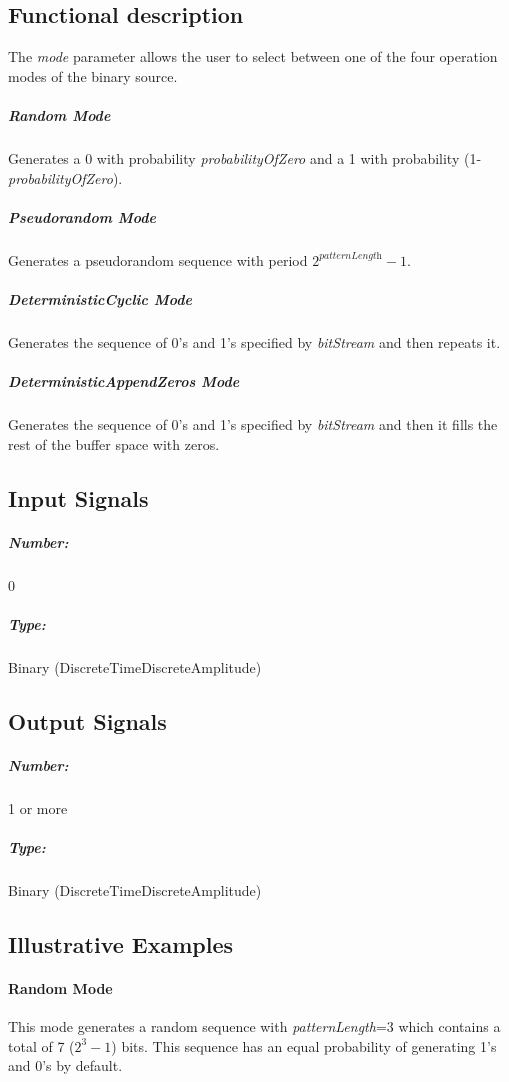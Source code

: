 \subsection*{Functional description}

The \textit{mode} parameter allows the user to select between one of the four operation modes of the binary source.

\subparagraph*{Random Mode}
Generates a 0 with probability \textit{probabilityOfZero} and a 1 with probability (1-\textit{probabilityOfZero}).

\subparagraph*{Pseudorandom Mode}
Generates a pseudorandom sequence with period $2^\textit{patternLength}-1$.

\subparagraph*{DeterministicCyclic Mode}
Generates the sequence of 0's and 1's specified by \textit{bitStream} and then repeats it.

\subparagraph*{DeterministicAppendZeros Mode}
Generates the sequence of 0's and 1's specified by \textit{bitStream} and then it fills the rest of the buffer space with zeros.



\subsection*{Input Signals}


\subparagraph*{Number:} 0

\subparagraph*{Type:} Binary (DiscreteTimeDiscreteAmplitude)

\subsection*{Output Signals}

\subparagraph*{Number:} 1 or more

\subparagraph*{Type:} Binary (DiscreteTimeDiscreteAmplitude)

\subsection*{Illustrative Examples}

\paragraph*{Random Mode}
This mode generates a random sequence with \textit{patternLength}=3 which contains a total of 7 ($2^3-1$) bits. This sequence has an equal probability of generating 1's and 0's by default.

